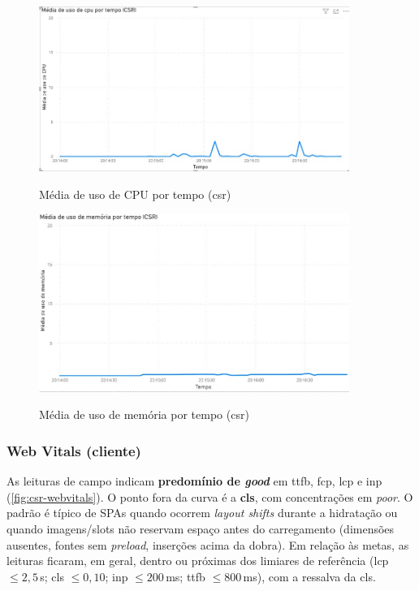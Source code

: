 \begin{figure}[H]
\centering
\caption{Média de uso de CPU por tempo (\acrshort{csr})}
\includegraphics[width=0.9\textwidth]{media/uso_cpu_csr.jpeg}
\label{fig:csr-cpu}
\end{figure}

\begin{figure}[H]
\centering
\caption{Média de uso de memória por tempo (\acrshort{csr})}
\includegraphics[width=0.9\textwidth]{media/uso_memoria_csr.jpeg}
\label{fig:csr-mem}
\end{figure}

\subsubsection{Web Vitals (cliente)}
As leituras de campo indicam \textbf{predomínio de \textit{good}} em \acrshort{ttfb}, \acrshort{fcp}, \acrshort{lcp} e \acrshort{inp} (\autoref{fig:csr-webvitals}). O ponto fora da curva é a \textbf{\acrshort{cls}}, com concentrações em \textit{poor}. O padrão é típico de SPAs quando ocorrem \emph{layout shifts} durante a hidratação ou quando imagens/slots não reservam espaço antes do carregamento (dimensões ausentes, fontes sem \emph{preload}, inserções acima da dobra). Em relação às metas, as leituras ficaram, em geral, dentro ou próximas dos limiares de referência (\acrshort{lcp} $\leq 2{,}5$\,s; \acrshort{cls} $\leq 0{,}10$; \acrshort{inp} $\leq 200$\,ms; \acrshort{ttfb} $\leq 800$\,ms), com a ressalva da \acrshort{cls}.

